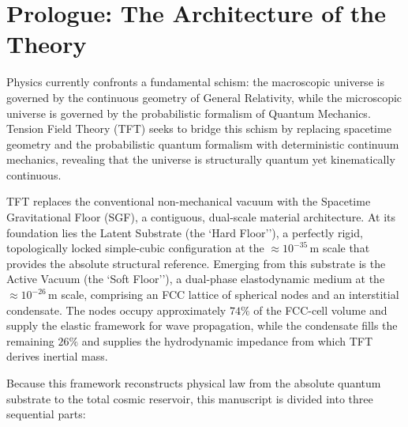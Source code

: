 \documentclass[11pt, letterpaper]{report}
\begin{document}
\clearpage
\tableofcontents
\clearpage


\chapter*{Prologue: The Architecture of the Theory}

Physics currently confronts a fundamental schism: the macroscopic universe is governed by the continuous geometry of General Relativity, while the microscopic universe is governed by the probabilistic formalism of Quantum Mechanics. Tension Field Theory (TFT) seeks to bridge this schism by replacing spacetime geometry and the probabilistic quantum formalism with deterministic continuum mechanics, revealing that the universe is structurally quantum yet kinematically continuous.

TFT replaces the conventional non-mechanical vacuum with the Spacetime Gravitational Floor (SGF), a contiguous, dual-scale material architecture. At its foundation lies the Latent Substrate (the `Hard Floor''), a perfectly rigid, topologically locked simple-cubic configuration at the \(\approx 10^{-35}\,\mathrm{m}\) scale that provides the absolute structural reference. Emerging from this substrate is the Active Vacuum (the `Soft Floor''), a dual-phase elastodynamic medium at the \(\approx 10^{-26}\,\mathrm{m}\) scale, comprising an FCC lattice of spherical nodes and an interstitial condensate. The nodes occupy approximately \(74\%\) of the FCC-cell volume and supply the elastic framework for wave propagation, while the condensate fills the remaining \(26\%\) and supplies the hydrodynamic impedance from which TFT derives inertial mass.

Because this framework reconstructs physical law from the absolute quantum substrate to the total cosmic reservoir, this manuscript is divided into three sequential parts:
\end{document}
